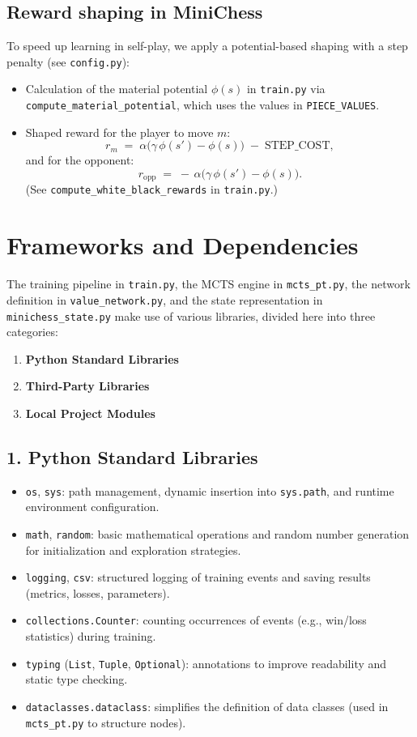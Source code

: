 \documentclass{report}
\begin{document}
\subsection{Reward shaping in MiniChess}
To speed up learning in self-play, we apply a potential-based shaping with a step penalty (see \texttt{config.py}):
\begin{itemize}
  \item Calculation of the material potential $\phi(s)$ in \texttt{train.py} via \texttt{compute\_material\_potential}, which uses the values in \texttt{PIECE\_VALUES}.
  \item Shaped reward for the player to move $m$:
    \[
      r_{m} \;=\;\alpha\bigl(\gamma\,\phi(s') - \phi(s)\bigr)\;-\;\mathrm{STEP\_COST},
    \]
    and for the opponent:
    \[
      r_{\text{opp}} \;=\; -\,\alpha\bigl(\gamma\,\phi(s') - \phi(s)\bigr).
    \]
    (See \texttt{compute\_white\_black\_rewards} in \texttt{train.py}.)
\end{itemize}

\section{Frameworks and Dependencies}
The training pipeline in \texttt{train.py}, the MCTS engine in \texttt{mcts\_pt.py}, the network definition in \texttt{value\_network.py}, and the state representation in \texttt{minichess\_state.py} make use of various libraries, divided here into three categories:  
\begin{enumerate}
  \item \textbf{Python Standard Libraries}
  \item \textbf{Third-Party Libraries}
  \item \textbf{Local Project Modules}
\end{enumerate}

\subsection*{1. Python Standard Libraries}
\begin{itemize}
  \item \texttt{os}, \texttt{sys}: path management, dynamic insertion into \texttt{sys.path}, and runtime environment configuration.
  \item \texttt{math}, \texttt{random}: basic mathematical operations and random number generation for initialization and exploration strategies.
  \item \texttt{logging}, \texttt{csv}: structured logging of training events and saving results (metrics, losses, parameters).
  \item \texttt{collections.Counter}: counting occurrences of events (e.g., win/loss statistics) during training.
  \item \texttt{typing} (\texttt{List}, \texttt{Tuple}, \texttt{Optional}): annotations to improve readability and static type checking.
  \item \texttt{dataclasses.dataclass}: simplifies the definition of data classes (used in \texttt{mcts\_pt.py} to structure nodes).
\end{itemize}
\end{document}
